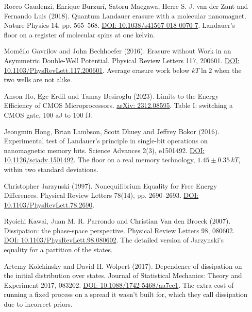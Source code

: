 \noindent Rocco Gaudenzi, Enrique Burzur\'i, Satoru Maegawa, Herre S. J. van der Zant and Fernando Luis (2018). Quantum Landauer erasure with a molecular nanomagnet. Nature Physics 14, pp. 565--568. \href{https://doi.org/10.1038/s41567-018-0070-7}{DOI: 10.1038/s41567-018-0070-7}. Landauer's floor on a register of molecular spins at one kelvin.
\par\medskip

\noindent Mom\v{c}ilo Gavrilov and John Bechhoefer (2016). Erasure without Work in an Asymmetric Double-Well Potential. Physical Review Letters 117, 200601. \href{https://doi.org/10.1103/PhysRevLett.117.200601}{DOI: 10.1103/PhysRevLett.117.200601}. Average erasure work below $kT\ln 2$ when the two wells are not alike.
\par\medskip

\noindent Anson Ho, Ege Erdil and Tamay Besiroglu (2023). Limits to the Energy Efficiency of CMOS Microprocessors. \href{https://arxiv.org/abs/2312.08595}{arXiv: 2312.08595}. Table I: switching a CMOS gate, 100 aJ to 100 fJ.
\par\medskip

\noindent Jeongmin Hong, Brian Lambson, Scott Dhuey and Jeffrey Bokor (2016). Experimental test of Landauer's principle in single-bit operations on nanomagnetic memory bits. Science Advances 2(3), e1501492. \href{https://doi.org/10.1126/sciadv.1501492}{DOI: 10.1126/sciadv.1501492}. The floor on a real memory technology, $1.45 \pm 0.35\,kT$, within two standard deviations.
\par\medskip

\noindent Christopher Jarzynski (1997). Nonequilibrium Equality for Free Energy Differences. Physical Review Letters 78(14), pp. 2690--2693. \href{https://doi.org/10.1103/PhysRevLett.78.2690}{DOI: 10.1103/PhysRevLett.78.2690}.
\par\medskip

\noindent Ryoichi Kawai, Juan M. R. Parrondo and Christian Van den Broeck (2007). Dissipation: the phase-space perspective. Physical Review Letters 98, 080602. \href{https://doi.org/10.1103/PhysRevLett.98.080602}{DOI: 10.1103/PhysRevLett.98.080602}. The detailed version of Jarzynski's equality for a partition of the states.
\par\medskip

\noindent Artemy Kolchinsky and David H. Wolpert (2017). Dependence of dissipation on the initial distribution over states. Journal of Statistical Mechanics: Theory and Experiment 2017, 083202. \href{https://doi.org/10.1088/1742-5468/aa7ee1}{DOI: 10.1088/1742-5468/aa7ee1}. The extra cost of running a fixed process on a spread it wasn't built for, which they call dissipation due to incorrect priors.
\par\medskip

